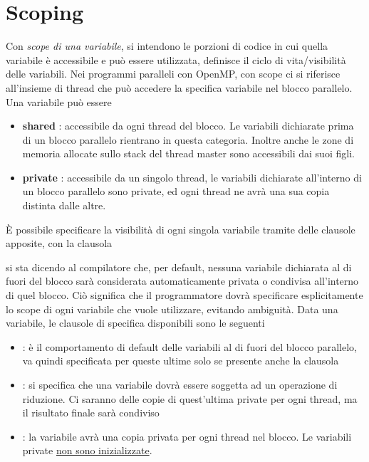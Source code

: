 \documentclass[10pt, letterpaper]{report}
\begin{document}
\section{Scoping}
Con \textit{scope di una variabile}, si intendono le porzioni di codice in cui quella variabile è accessibile e può essere utilizzata, definisce il ciclo di vita/visibilità delle variabili. Nei programmi paralleli con OpenMP, con scope ci si riferisce all'insieme di thread che può accedere la specifica variabile nel blocco parallelo. Una variabile può essere\begin{itemize}
    \item \textbf{shared} : accessibile da ogni thread del blocco. Le variabili dichiarate prima di un blocco parallelo rientrano in questa categoria. Inoltre anche le zone di memoria allocate sullo stack del thread master sono accessibili dai suoi figli.
    \item \textbf{private} : accessibile da un singolo thread, le variabili dichiarate all'interno di un blocco parallelo sono private, ed ogni thread ne avrà una sua copia distinta dalle altre.
\end{itemize}
È possibile specificare la visibilità di ogni singola variabile tramite delle clausole apposite, con la clausola \begin{quote}
\end{quote}
si sta dicendo al compilatore che, per default, nessuna variabile dichiarata al di fuori del blocco sarà considerata automaticamente privata o condivisa all'interno di quel blocco. Ciò significa che il programmatore dovrà specificare esplicitamente lo scope di ogni variabile che vuole utilizzare, evitando ambiguità. Data una variabile, le clausole di specifica disponibili sono le seguenti\begin{itemize}
    \item {} : è il comportamento di default delle variabili al di fuori del blocco parallelo, va quindi specificata per queste ultime solo se presente anche la clausola 
    \item {} : si specifica che una variabile dovrà essere soggetta ad un operazione di riduzione. Ci saranno delle copie di quest'ultima private per ogni thread, ma il risultato finale sarà condiviso
    \item {} : la variabile avrà una copia privata per ogni thread nel blocco. Le variabili private \underline{non sono inizializzate}.
\end{itemize}
\end{document}

